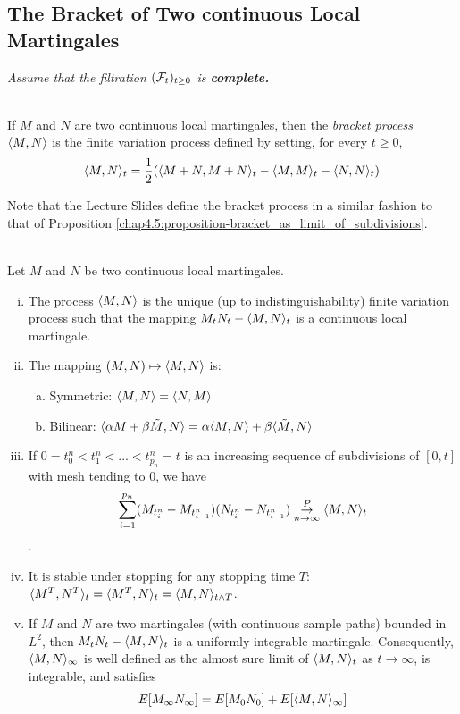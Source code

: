 \subsection{The Bracket of Two continuous Local Martingales}
\textit{Assume that the filtration $(\mathcal{F}_t)_{t\geq0}$ is \textbf{complete.}}

\begin{definition}[Bracket $\br{M,N}$]\label{chap4.4:definition-bracket_process}
 \\
If $M$ and $N$ are two continuous local martingales, then the \textit{bracket process} $\br{M,N}$ is the finite variation process defined by setting, for every $t \geq 0$,
$$\langle M,N\rangle_t=\frac12(\langle M+N,M+N\rangle_t - \langle M,M\rangle_t - \langle N,N\rangle_t)$$
\end{definition}
Note that the Lecture Slides define the bracket process in a similar fashion to that of Proposition \ref{chap4.5:proposition-bracket_as_limit_of_subdivisions}.

\begin{properties}\label{chap4.4:properties-properties_of_the_bracket_process}
 \\
Let $M$ and $N$ be two continuous local martingales.
\begin{enumerate}[(i)]
    \item The process $\br{M,N}$ is the unique (up to indistinguishability) finite variation process such that the mapping
    $M_tN_t - \langle M,N\rangle_t$
    is a continuous local martingale.
    \item The mapping $(M,N) \mapsto \langle M,N\rangle$ is:
    \begin{enumerate}[(a)]
        \item Symmetric: $\langle M,N\rangle=\langle N,M\rangle$
        \item Bilinear: $\langle \alpha M+ \beta \tilde{M},N\rangle=\alpha\langle M,N\rangle + \beta\langle \tilde{M},N\rangle$
    \end{enumerate}
    \item If $0 = t_0^n<t_1^n<...<t_{p_n}^n=t$ is an increasing sequence of subdivisions of $[0,t]$ with mesh tending to $0$, we have
    $$\sum_{i=1}^{p_n}(M_{t_i^n}-M_{t_{i-1}^n})(N_{t_i^n}-N_{t_{i-1}^n})\overset{P}{\underset{n \to \infty}{\to}}\langle M,N\rangle_t$$.
    \item It is stable under stopping for any stopping time $T$: $\langle M^T,N^T\rangle_t=\langle M^T,N\rangle_t=\langle M,N\rangle_{t \land T}$.
    \item If $M$ and $N$ are two martingales (with continuous sample paths) bounded in $L^2$, then $M_tN_t-\langle M,N\rangle_t$ is a uniformly integrable martingale. Consequently, $\langle M,N\rangle_\infty$ is well defined as the almost sure limit of $\langle M,N\rangle_t$ as $t \to \infty$, is integrable, and satisfies
    $$E[M_\infty N_\infty]=E[M_0 N_0]+E[\langle M,N\rangle_\infty]$$
\end{enumerate}
\end{properties}

